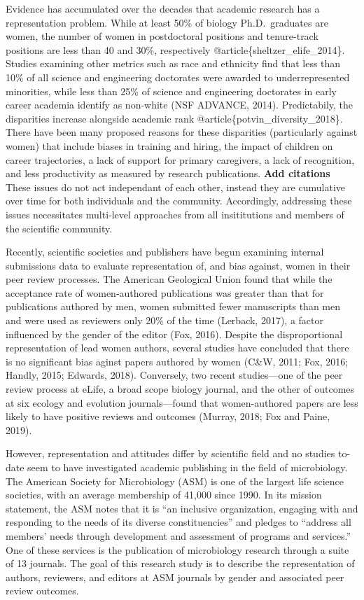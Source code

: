 \documentclass[11pt,]{article}
\begin{document}
Evidence has accumulated over the decades that academic research has a
representation problem. While at least 50\% of biology Ph.D.~graduates
are women, the number of women in postdoctoral positions and
tenure-track positions are less than 40 and 30\%, respectively
@article\{sheltzer\_elife\_2014\}. Studies examining other metrics such
as race and ethnicity find that less than 10\% of all science and
engineering doctorates were awarded to underrepresented minorities,
while less than 25\% of science and engineering doctorates in early
career academia identify as non-white (NSF ADVANCE, 2014). Predictabily,
the disparities increase alongside academic rank
@article\{potvin\_diversity\_2018\}. There have been many proposed
reasons for these disparities (particularly against women) that include
biases in training and hiring, the impact of children on career
trajectories, a lack of support for primary caregivers, a lack of
recognition, and less productivity as measured by research publications.
\textbf{Add citations} These issues do not act independant of each
other, instead they are cumulative over time for both individuals and
the community. Accordingly, addressing these issues necessitates
multi-level approaches from all insititutions and members of the
scientific community.

Recently, scientific societies and publishers have begun examining
internal submissions data to evaluate representation of, and bias
against, women in their peer review processes. The American Geological
Union found that while the acceptance rate of women-authored
publications was greater than that for publications authored by men,
women submitted fewer manuscripts than men and were used as reviewers
only 20\% of the time (Lerback, 2017), a factor influenced by the gender
of the editor (Fox, 2016). Despite the disproportional representation of
lead women authors, several studies have concluded that there is no
significant bias aginst papers authored by women (C\&W, 2011; Fox, 2016;
Handly, 2015; Edwards, 2018). Conversely, two recent studies---one of
the peer review process at eLife, a broad scope biology journal, and the
other of outcomes at six ecology and evolution journals---found that
women-authored papers are less likely to have positive reviews and
outcomes (Murray, 2018; Fox and Paine, 2019).

However, representation and attitudes differ by scientific field and no
studies to-date seem to have investigated academic publishing in the
field of microbiology. The American Society for Microbiology (ASM) is
one of the largest life science societies, with an average membership of
41,000 since 1990. In its mission statement, the ASM notes that it is
``an inclusive organization, engaging with and responding to the needs
of its diverse constituencies'' and pledges to ``address all members'
needs through development and assessment of programs and services.'' One
of these services is the publication of microbiology research through a
suite of 13 journals. The goal of this research study is to describe the
representation of authors, reviewers, and editors at ASM journals by
gender and associated peer review outcomes.
\end{document}
